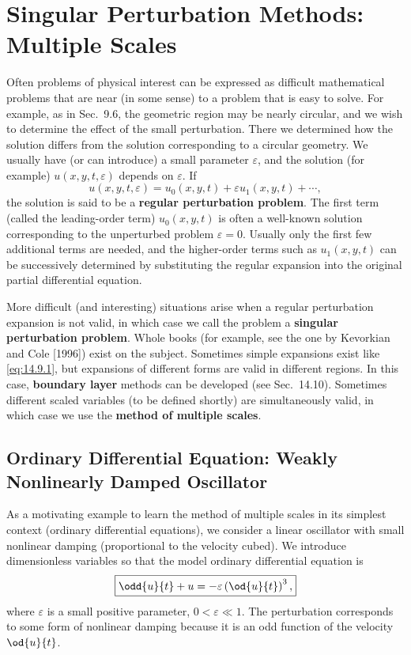 
\section{Singular Perturbation Methods: Multiple Scales}
\label{sec:14.9}

Often problems of physical interest can be expressed as difficult mathematical problems that are near (in some sense) to a problem that is easy to solve. For example, as in Sec.\ 9.6, the geometric region may be nearly circular, and we wish to determine the effect of the small perturbation. There we determined how the solution differs from the solution corresponding to a circular geometry. We usually have (or can introduce) a small parameter $\varepsilon$, and the solution (for example) $u(x,y,t,\varepsilon)$ depends on $\varepsilon$. If
\begin{equation}
u(x,y,t,\varepsilon) = u_0(x,y,t) + \varepsilon u_1(x,y,t) + \cdots,
\label{eq:14.9.1}
\end{equation}
the solution is said to be a \textbf{regular perturbation problem}. The first term (called the leading-order term) $u_0(x,y,t)$ is often a well-known solution corresponding to the unperturbed problem $\varepsilon = 0$. Usually only the first few additional terms are needed, and the higher-order terms such as $u_1(x,y,t)$ can be successively determined by substituting the regular expansion into the original partial differential equation.

More difficult (and interesting) situations arise when a regular perturbation expansion is not valid, in which case we call the problem a \textbf{singular perturbation problem}. Whole books (for example, see the one by Kevorkian and Cole [1996]) exist on the subject. Sometimes simple expansions exist like \eqref{eq:14.9.1}, but expansions of different forms are valid in different regions. In this case, \textbf{boundary layer} methods can be developed (see Sec.\ 14.10). Sometimes different scaled variables (to be defined shortly) are simultaneously valid, in which case we use the \textbf{method of multiple scales}.

\subsection{Ordinary Differential Equation: Weakly Nonlinearly Damped Oscillator}
\label{subsec:14.9.1}

As a motivating example to learn the method of multiple scales in its simplest context (ordinary differential equations), we consider a linear oscillator with small nonlinear damping (proportional to the velocity cubed). We introduce dimensionless variables so that the model ordinary differential equation is
\begin{equation}
\boxed{\odd{u}{t} + u = -\varepsilon\left(\od{u}{t}\right)^3,}
\label{eq:14.9.2}
\end{equation}
where $\varepsilon$ is a small positive parameter, $0 < \varepsilon \ll 1$. The perturbation corresponds to some form of nonlinear damping because it is an odd function of the velocity $\od{u}{t}$.

